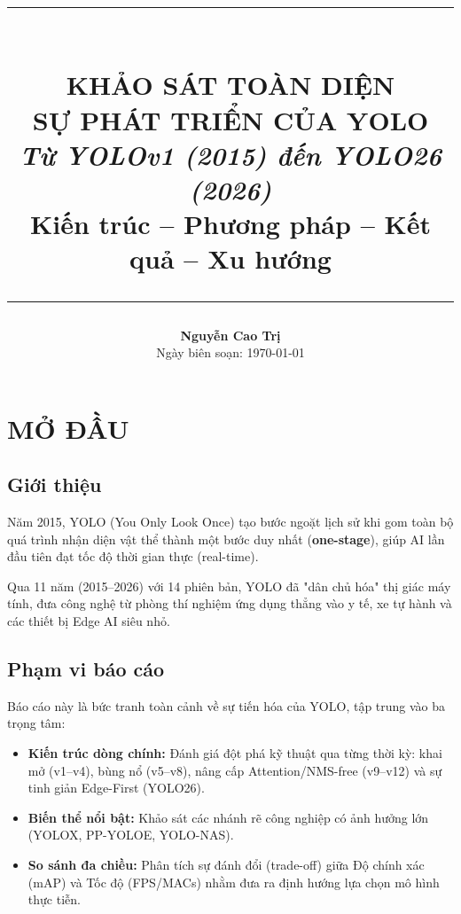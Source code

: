 \documentclass[12pt,a4paper]{report}
\title{
\vspace{-1cm}
{\color{rulegray}\rule{\textwidth}{1.5pt}}\\[0.8cm]
{\Huge\bfseries\color{chaptercolor} KHẢO SÁT TOÀN DIỆN\\[0.2cm] SỰ PHÁT TRIỂN CỦA YOLO}\\[0.6cm]
{\Large\color{sectioncolor}\textit{Từ YOLOv1 (2015) đến YOLO26 (2026)}}\\[0.3cm]
{\large\color{titlegray} Kiến trúc -- Phương pháp -- Kết quả -- Xu hướng}\\[0.6cm]
{\color{rulegray}\rule{\textwidth}{1.5pt}}
}
\author{
\large\color{chaptercolor}\textbf{Nguyễn Cao Trị}\\[0.3cm]
{\small\color{titlegray} Ngày biên soạn: \today}
}
\date{}
\begin{document}
\maketitle
\thispagestyle{empty}

\newpage
\tableofcontents
\thispagestyle{empty}
\newpage


\chapter{MỞ ĐẦU}

\section{Giới thiệu}

Năm 2015, YOLO (You Only Look Once) tạo bước ngoặt lịch sử khi gom toàn bộ quá trình nhận diện vật thể thành một bước duy nhất (\textbf{one-stage}), giúp AI lần đầu tiên đạt tốc độ thời gian thực (real-time). 

Qua 11 năm (2015–2026) với 14 phiên bản, YOLO đã "dân chủ hóa" thị giác máy tính, đưa công nghệ từ phòng thí nghiệm ứng dụng thẳng vào y tế, xe tự hành và các thiết bị Edge AI siêu nhỏ.

\section{Phạm vi báo cáo}

Báo cáo này là bức tranh toàn cảnh về sự tiến hóa của YOLO, tập trung vào ba trọng tâm:

\begin{itemize}
    \item \textbf{Kiến trúc dòng chính:} Đánh giá đột phá kỹ thuật qua từng thời kỳ: khai mở (v1--v4), bùng nổ (v5--v8), nâng cấp Attention/NMS-free (v9--v12) và sự tinh giản Edge-First (YOLO26).
    \item \textbf{Biến thể nổi bật:} Khảo sát các nhánh rẽ công nghiệp có ảnh hưởng lớn (YOLOX, PP-YOLOE, YOLO-NAS).
    \item \textbf{So sánh đa chiều:} Phân tích sự đánh đổi (trade-off) giữa Độ chính xác (mAP) và Tốc độ (FPS/MACs) nhằm đưa ra định hướng lựa chọn mô hình thực tiễn.
\end{itemize}



\end{document}
